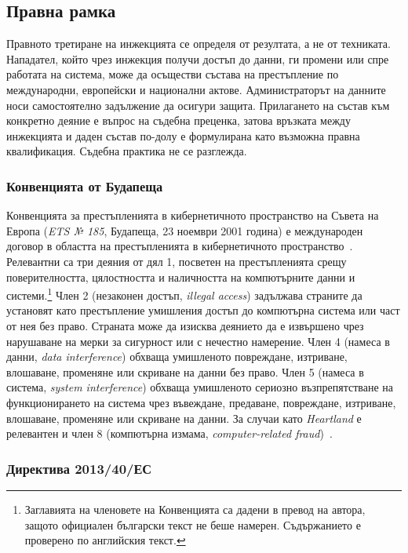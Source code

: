 \subsection{Правна рамка}
\label{sec:cybercrime-law}

Правното третиране на инжекцията се определя от резултата, а не от техниката.
Нападател, който чрез инжекция получи достъп до данни, ги промени или спре работата
на система, може да осъществи състава на престъпление по международни, европейски и
национални актове. Администраторът на данните носи самостоятелно задължение да
осигури защита. Прилагането на състав към конкретно деяние е въпрос на съдебна
преценка, затова връзката между инжекцията и даден състав по-долу е формулирана като
възможна правна квалификация. Съдебна практика не се разглежда.

\subsubsection{Конвенцията от Будапеща}

Конвенцията за престъпленията в кибернетичното пространство на Съвета на Европа
(\textit{ETS № 185}, Будапеща, 23 ноември 2001 година) е международен
договор в областта на престъпленията в кибернетичното пространство~\cite{budapest_convention}. Релевантни са три деяния от дял 1,
посветен на престъпленията срещу поверителността, цялостността и наличността на
компютърните данни и системи.\footnote{Заглавията на членовете на Конвенцията са
дадени в превод на автора, защото официален български текст не беше намерен.
Съдържанието е проверено по английския текст.} Член 2 (незаконен достъп,
\textit{illegal access}) задължава страните да установят като престъпление
умишления достъп до компютърна система или част от нея без право. Страната може да изисква деянието да е извършено
чрез нарушаване на мерки за сигурност или с нечестно намерение. Член 4 (намеса в
данни, \textit{data interference}) обхваща умишленото повреждане, изтриване,
влошаване, променяне или скриване на данни без право. Член 5 (намеса в система,
\textit{system interference}) обхваща умишленото сериозно възпрепятстване на
функционирането на система чрез въвеждане, предаване, повреждане, изтриване,
влошаване, променяне или скриване на данни. За случаи като \textit{Heartland} е
релевантен и член 8 (компютърна измама, \textit{computer-related fraud})~\cite{budapest_convention}.

\subsubsection{Директива 2013/40/ЕС}


